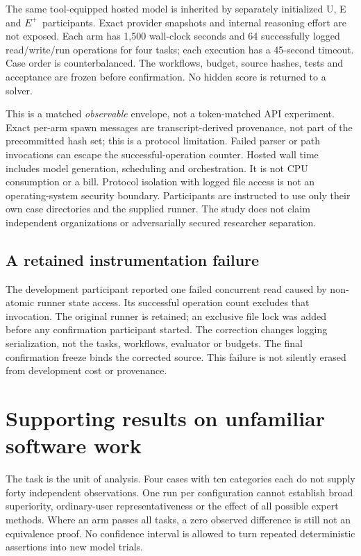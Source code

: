 \documentclass[11pt,letterpaper]{article}
\newcommand{\Eplus}{\ensuremath{E^{+}}}
\begin{document}
The same tool-equipped hosted model is inherited by separately initialized U, E and \Eplus\ participants. Exact provider snapshots and internal reasoning effort are not exposed. Each arm has 1,500 wall-clock seconds and 64 successfully logged read/write/run operations for four tasks; each execution has a 45-second timeout. Case order is counterbalanced. The workflows, budget, source hashes, tests and acceptance are frozen before confirmation. No hidden score is returned to a solver.

This is a matched \emph{observable} envelope, not a token-matched API experiment. Exact per-arm spawn messages are transcript-derived provenance, not part of the precommitted hash set; this is a protocol limitation. Failed parser or path invocations can escape the successful-operation counter. Hosted wall time includes model generation, scheduling and orchestration. It is not CPU consumption or a bill. Protocol isolation with logged file access is not an operating-system security boundary. Participants are instructed to use only their own case directories and the supplied runner. The study does not claim independent organizations or adversarially secured researcher separation.

\subsection{A retained instrumentation failure}
The development participant reported one failed concurrent read caused by non-atomic runner state access. Its successful operation count excludes that invocation. The original runner is retained; an exclusive file lock was added before any confirmation participant started. The correction changes logging serialization, not the tasks, workflows, evaluator or budgets. The final confirmation freeze binds the corrected source. This failure is not silently erased from development cost or provenance.

\section{Supporting results on unfamiliar software work}


The task is the unit of analysis. Four cases with ten categories each do not supply forty independent observations. One run per configuration cannot establish broad superiority, ordinary-user representativeness or the effect of all possible expert methods. Where an arm passes all tasks, a zero observed difference is still not an equivalence proof. No confidence interval is allowed to turn repeated deterministic assertions into new model trials.
\end{document}
